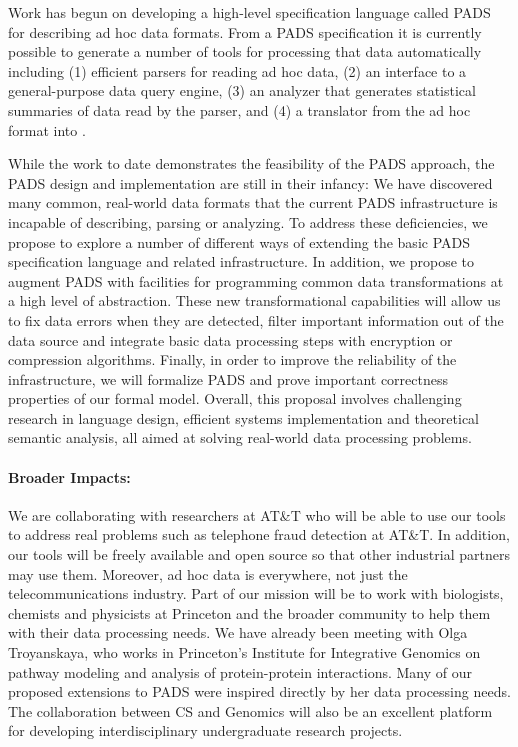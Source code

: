 Work has begun on developing a high-level specification 
language called PADS for describing ad hoc data formats.  From a
PADS specification it is currently possible to generate a number of
tools for processing that data automatically including (1)
efficient parsers for reading ad hoc data, (2) an interface to a 
general-purpose data query engine, (3) an analyzer that generates 
statistical summaries of data read by the parser, and (4)
a translator from the ad hoc format into \xml.  

While the work to date demonstrates the feasibility of the PADS
approach, the PADS design and implementation are still in their infancy:
We have discovered many common, real-world data formats that the current PADS 
infrastructure is incapable of describing, parsing or analyzing. 
To address these deficiencies, we propose to explore a number of different ways
of extending the basic PADS specification language and related
infrastructure.  In addition, we propose to augment PADS with
facilities for programming common data transformations at a
high level of abstraction.  These new transformational capabilities
will allow us to fix data errors when they are detected, filter
important information out of the data source and integrate basic data 
processing steps with encryption or compression algorithms.
Finally, in order to improve the reliability of the infrastructure,
we will formalize PADS and prove important correctness properties
of our formal model.  Overall, this proposal involves challenging research in
language design, efficient systems implementation and theoretical
semantic analysis, all aimed at solving real-world data processing 
problems.

\paragraph*{Broader Impacts:}  We are collaborating with researchers at
AT\&T who will be able to use our tools to address real problems such as
telephone fraud detection at AT\&T.  In addition, our tools will be 
freely available and open source so that other industrial partners
may use them.  Moreover, ad hoc data is everywhere, not just the
telecommunications industry.  Part of our mission will be to work with 
biologists, chemists and physicists at Princeton and the broader community
to help them with their data 
processing needs.  We have already been meeting with Olga Troyanskaya,
who works in Princeton's Institute for Integrative Genomics 
on pathway modeling and analysis of protein-protein interactions.  Many of our proposed
extensions to PADS were inspired directly by her data processing needs.
The collaboration between CS and Genomics will also be an excellent platform
for developing interdisciplinary undergraduate research projects.

